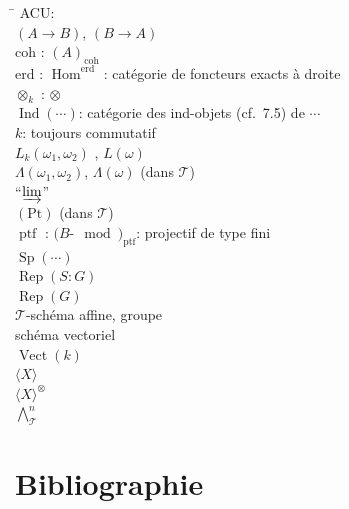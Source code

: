 \documentclass[12pt,a4paper]{article}
\theoremstyle{plain}
\theoremstyle{definition}
\DeclareMathOperator{\Sp}{Sp}
\DeclareMathOperator{\Hom}{Hom}
\DeclareMathOperator{\Rep}{Rep}
\DeclareMathOperator{\Vect}{Vect}
\DeclareMathOperator{\Ind}{Ind}
\DeclareMathOperator{\ptf}{ptf}
\newcommand{\coh}{\mathrm{coh}}
\newcommand{\eed}{\text{erd}}
\begin{document}
\begin{tabbing}
\hspace{3cm} \= \kill
ACU:  \\[4pt]
$(A \to B)$, $(B \to A)$  \\
$\coh$ : $(A)_{\coh}$  \\[4pt]
$\eed$ : $\Hom^{\eed}$ : catégorie de foncteurs exacts à droite  \\
$\otimes_k$ : $\otimes$  \\[4pt]
$\Ind(\cdots)$: catégorie des ind-objets (cf.~7.5) de $\cdots$ \>  \\
$k$: toujours commutatif \\[4pt]
$L_k(\omega_1, \omega_2)$ , $L(\omega)$  \\
$\Lambda(\omega_1, \omega_2)$, $\Lambda(\omega)$ (dans $\mathcal{T}$)  \\
``$\varinjlim$''  \\[4pt]
$(\mathrm{Pt})$ (dans $\mathcal{T}$)  \\
$\ptf$ : $(B\text{-}\mod)_{\ptf}$: projectif de type fini  \\[4pt]
$\Sp(\cdots)$  \\
$\Rep(S : G)$  \\
$\Rep(G)$  \\[4pt]
$\mathcal{T}$-schéma affine, groupe  \\
schéma vectoriel  \\
$\Vect(k)$  \\[4pt]
$\langle X \rangle$  \\
$\langle X \rangle^\otimes$  \\
$\bigwedge^n_\mathcal{T}$ 
\end{tabbing}

\section*{Bibliographie}
\end{document}
